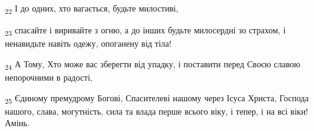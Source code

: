 \begin{tcolorbox}
\textsubscript{22} І до одних, хто вагається, будьте милостиві,
\end{tcolorbox}
\begin{tcolorbox}
\textsubscript{23} спасайте і виривайте з огню, а до інших будьте милосердні зо страхом, і ненавидьте навіть одежу, опоганену від тіла!
\end{tcolorbox}
\begin{tcolorbox}
\textsubscript{24} А Тому, Хто може вас зберегти від упадку, і поставити перед Своєю славою непорочними в радості,
\end{tcolorbox}
\begin{tcolorbox}
\textsubscript{25} Єдиному премудрому Богові, Спасителеві нашому через Ісуса Христа, Господа нашого, слава, могутність, сила та влада перше всього віку, і тепер, і на всі віки! Амінь.
\end{tcolorbox}
